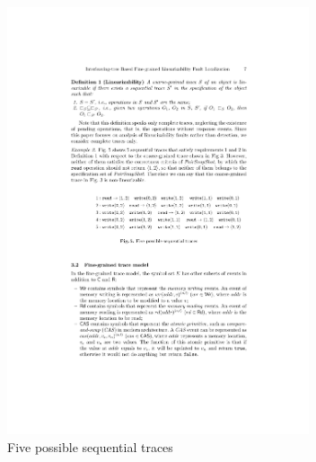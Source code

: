 \documentclass[runningheads]{llncs}
\newcommand{\pair}[1]{{\langle{#1}\rangle}}
\begin{document}
\begin{figure}
\centering
\includegraphics[width = 3.5in]{5seqs.pdf}
	
	
	
	
    \caption{Five possible sequential traces}\label{fig:accounttwoseqtraces}
\end{figure}
\end{document}
